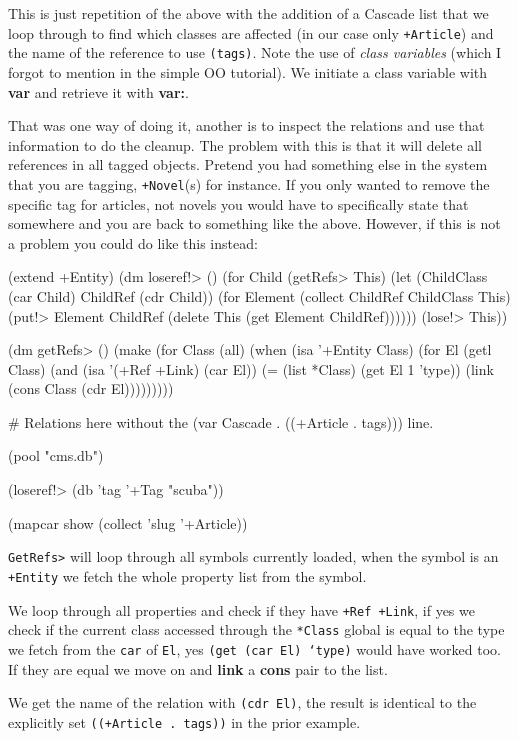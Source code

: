 This is just repetition of the above with the addition of a Cascade
list that we loop through to find which classes are affected (in our
case only \texttt{+Article}) and the name of the reference to use
\texttt{(tags)}. Note the use of \emph{class variables} (which I
forgot to mention in the simple OO tutorial). We initiate a class
variable with \textbf{var} and retrieve it with \textbf{var:}.

That was one way of doing it, another is to inspect the relations and
use that information to do the cleanup. The problem with this is that it
will delete all references in all tagged objects. Pretend you had
something else in the system that you are tagging, \texttt{+Novel}(s) for
instance. If you only wanted to remove the specific tag for articles,
not novels you would have to specifically state that somewhere and you
are back to something like the above. However, if this is not a problem
you could do like this instead:

\begin{wideverbatim}
(extend +Entity)
(dm loseref!> ()
    (for Child (getRefs> This) 
         (let (ChildClass (car Child) ChildRef (cdr Child)) 
           (for Element (collect ChildRef ChildClass This)
                (put!> Element ChildRef (delete This (get Element ChildRef))))))
    (lose!> This))

(dm getRefs> ()
    (make 
     (for Class (all)
          (when (isa '+Entity Class) 
            (for El (getl Class) 
                 (and 
                  (isa '(+Ref +Link) (car El))
                  (= (list *Class) (get El 1 'type))
                  (link (cons Class (cdr El)))))))))

\end{wideverbatim}

\begin{wideverbatim}


# Relations here without the (var Cascade . ((+Article . tags))) line.

(pool "cms.db")

(loseref!> (db 'tag '+Tag "scuba"))

(mapcar show (collect 'slug '+Article))
\end{wideverbatim}

\texttt{GetRefs>} will loop through all symbols currently loaded, when
the symbol is an \texttt{+Entity} we fetch the whole property list
from the symbol.

We loop through all properties and check if they have \texttt{+Ref
  +Link}, if yes we check if the current class accessed through the
\texttt{*Class} global is equal to the type we fetch from the
\texttt{car} of \texttt{El}, yes \texttt{(get (car El) ‘type)} would
have worked too. If they are equal we move on and \textbf{link} a
\textbf{cons} pair to the list.

We get the name of the relation with \texttt{(cdr El)}, the result is
identical to the explicitly set \texttt{((+Article . tags))} in the
prior example.

